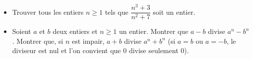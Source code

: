 \begin{itemize}
  \item Trouver tous les entiers $n \geq 1$ tels que $\dfrac{n^3 + 3}{n^2 + 7}$
  soit un entier.
  \item Soient $a$ et $b$ deux entiers et $n \geq 1$ un entier. Montrer que $a - b$
  divise $a^n - b^n$. Montrer que, si $n$ est impair, $a + b$ divise $a^n + b^n$
  (si $a=b$ ou $a=-b$, le diviseur est nul et l'on convient que $0$ divise
  seulement $0$).
\end{itemize}
